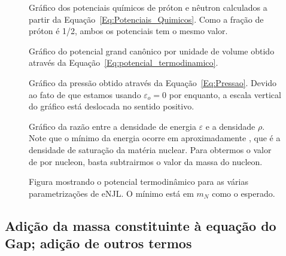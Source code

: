 \begin{figure}
	
	\caption{Gráfico dos potenciais químicos de próton e nêutron calculados a partir da Equação~\eqref{Eq:Potenciais_Quimicos}. Como a fração de próton é 1/2, ambos os potenciais tem o mesmo valor. \protect}
	\label{Fig:chemical_potential_graph}
\end{figure}

\begin{figure}
	
	\caption{Gráfico do potencial grand canônico por unidade de volume obtido através da Equação~\eqref{Eq:potencial_termodinamico}. \protect}
	\label{Fig:thermodynamic_potential_graph}
\end{figure}

\begin{figure}
	
	\caption{Gráfico da pressão obtido através da Equação~\eqref{Eq:Pressao}. Devido ao fato de que estamos usando $\varepsilon_o = 0$ por enquanto, a escala vertical do gráfico está deslocada no sentido positivo. \protect}
	\label{Fig:pressure_graph}
\end{figure}

\begin{figure}
	
	\caption{Gráfico da razão entre a densidade de energia $\varepsilon$ e a densidade $\rho$. Note que o mínimo da energia ocorre em aproximadamente , que é a densidade de saturação da matéria nuclear. Para obtermos o valor de  por nucleon, basta subtrairmos o valor da massa do nucleon. \protect}
	\label{Fig:energy_by_nucleon_graph}
\end{figure}

\begin{figure}
	
	\caption{Figura mostrando o potencial termodinâmico para as várias parametrizações de eNJL. O mínimo está em $m_N$ como o esperado.}
	\label{Fig:PotencialTerm_vs_mass-eNJL}
\end{figure}


\FloatBarrier
\subsection{Adição da massa constituinte à equação do Gap; adição de outros termos}


